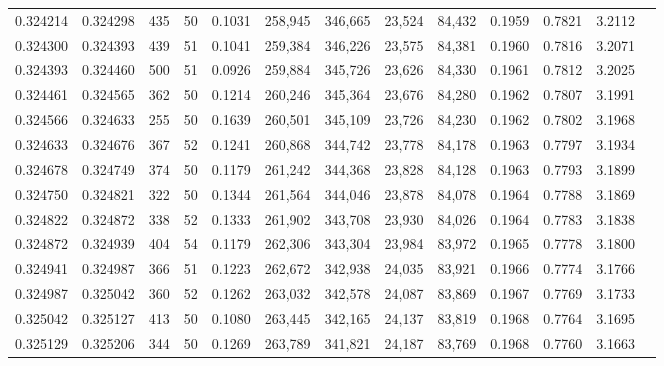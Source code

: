 \begin{tabular}{rrrrrrrrrrrrr}
0.324214 & 0.324298 &   435 &  50 &                                     0.1031 & 258,945 & 346,665 &  23,524 &  84,432 & 0.1959 & 0.7821 & 3.2112 \\
0.324300 & 0.324393 &   439 &  51 &                                     0.1041 & 259,384 & 346,226 &  23,575 &  84,381 & 0.1960 & 0.7816 & 3.2071 \\
0.324393 & 0.324460 &   500 &  51 &                                     0.0926 & 259,884 & 345,726 &  23,626 &  84,330 & 0.1961 & 0.7812 & 3.2025 \\
0.324461 & 0.324565 &   362 &  50 &                                     0.1214 & 260,246 & 345,364 &  23,676 &  84,280 & 0.1962 & 0.7807 & 3.1991 \\
0.324566 & 0.324633 &   255 &  50 &                                     0.1639 & 260,501 & 345,109 &  23,726 &  84,230 & 0.1962 & 0.7802 & 3.1968 \\
0.324633 & 0.324676 &   367 &  52 &                                     0.1241 & 260,868 & 344,742 &  23,778 &  84,178 & 0.1963 & 0.7797 & 3.1934 \\
0.324678 & 0.324749 &   374 &  50 &                                     0.1179 & 261,242 & 344,368 &  23,828 &  84,128 & 0.1963 & 0.7793 & 3.1899 \\
0.324750 & 0.324821 &   322 &  50 &                                     0.1344 & 261,564 & 344,046 &  23,878 &  84,078 & 0.1964 & 0.7788 & 3.1869 \\
0.324822 & 0.324872 &   338 &  52 &                                     0.1333 & 261,902 & 343,708 &  23,930 &  84,026 & 0.1964 & 0.7783 & 3.1838 \\
0.324872 & 0.324939 &   404 &  54 &                                     0.1179 & 262,306 & 343,304 &  23,984 &  83,972 & 0.1965 & 0.7778 & 3.1800 \\
0.324941 & 0.324987 &   366 &  51 &                                     0.1223 & 262,672 & 342,938 &  24,035 &  83,921 & 0.1966 & 0.7774 & 3.1766 \\
0.324987 & 0.325042 &   360 &  52 &                                     0.1262 & 263,032 & 342,578 &  24,087 &  83,869 & 0.1967 & 0.7769 & 3.1733 \\
0.325042 & 0.325127 &   413 &  50 &                                     0.1080 & 263,445 & 342,165 &  24,137 &  83,819 & 0.1968 & 0.7764 & 3.1695 \\
0.325129 & 0.325206 &   344 &  50 &                                     0.1269 & 263,789 & 341,821 &  24,187 &  83,769 & 0.1968 & 0.7760 & 3.1663 \\

\end{tabular}
